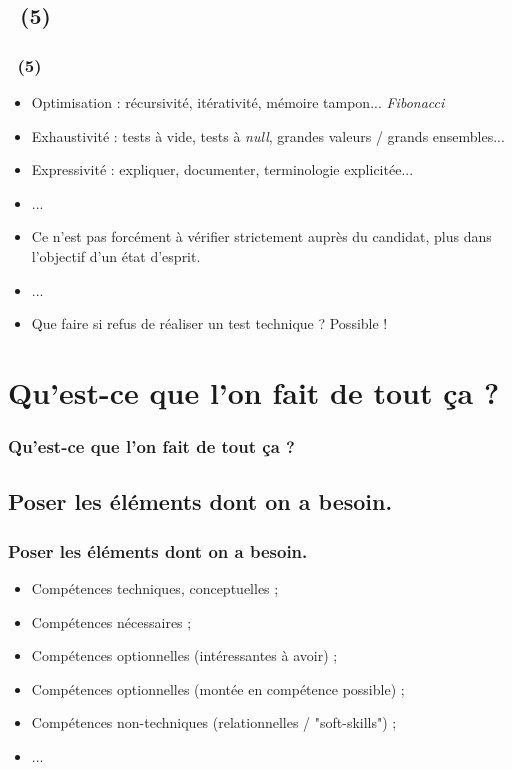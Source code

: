 \documentclass{beamer}
\begin{document}
\subsection{\titleExemplesCyberFizzBuzz ~(5)}
\begin{frame}
	\frametitle{\titleExemplesCyberFizzBuzz ~(5)}
	\begin{itemize}
		\item Optimisation : r{\'e}cursivit{\'e}, it{\'e}rativit{\'e}, m{\'e}moire tampon... \emph{Fibonacci}
		\item Exhaustivit{\'e} : tests {\`a} vide, tests {\`a} \emph{null}, grandes valeurs / grands ensembles...
		\item Expressivit{\'e} : expliquer, documenter, terminologie explicit{\'e}e... 
		\item ...
		\item Ce n'est pas forc{\'e}ment {\`a} v{\'e}rifier strictement aupr{\`e}s du candidat, plus dans l'objectif d'un {\'e}tat d'esprit.
		\item ... 
		\item Que faire si refus de r{\'e}aliser un test technique ? Possible !
	\end{itemize}
\end{frame} 

\section{Qu'est-ce que l'on fait de tout \c{c}a ?}
\begin{frame}
	\frametitle{Qu'est-ce que l'on fait de tout \c{c}a ?}
	\tableofcontents[sections=4,currentsection,subsectionstyle=show/shaded/hide] %
\end{frame} 

\subsection{Poser les {\'e}l{\'e}ments dont on a besoin. }
\begin{frame}
	\frametitle{Poser les {\'e}l{\'e}ments dont on a besoin. }
	\begin{itemize}
		\item Comp{\'e}tences techniques, conceptuelles ; 
		\item Comp{\'e}tences n{\'e}cessaires ; 
		\item Comp{\'e}tences optionnelles (int{\'e}ressantes {\`a} avoir) ; 
		\item Comp{\'e}tences optionnelles (mont{\'e}e en comp{\'e}tence possible) ;
		\item Comp{\'e}tences non-techniques (relationnelles / "soft-skills") ;  
		\item ... 
	\end{itemize}
\end{frame} 
\end{document}
